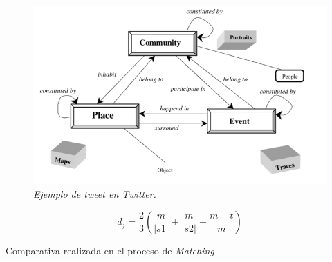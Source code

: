 \begin{figure}
  \centering
  \includegraphics[scale=1]{images/Figura2-1}
  \caption{\em Ejemplo de \textit{tweet} en \textit{Twitter}.}
  \label{fig:mt-im1}
\end{figure}

\begin{equation}
d_j = \frac{2}{3} \left ( \frac{m}{\left | s1 \right |} + \frac{m}{\left | s2 \right |} + \frac{m-t}{m} \right )
\end{equation}

\begin{table}[h]
  \begin{center}
    \caption{Comparativa realizada en el proceso de \textit{Matching}}
    \label{tab:mt-tab01}
  \end{center}
\end{table}
